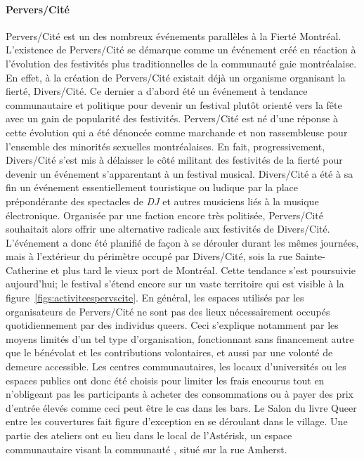 \paragraph{Pervers/Cité}
\label{subsec:perverscite}
Pervers/Cité est un des nombreux événements parallèles à la Fierté Montréal.
L'existence de Pervers/Cité se démarque comme un événement créé en réaction à l'évolution des festivités plus traditionnelles de la communauté gaie montréalaise.
En effet, à la création de Pervers/Cité existait déjà un organisme organisant la fierté, Divers/Cité.
Ce dernier a d'abord été un événement à tendance communautaire et politique pour devenir un festival plutôt orienté vers la fête avec un gain de popularité des festivités.
Pervers/Cité est né d'une réponse à cette évolution qui a été dénoncée comme marchande et non rassembleuse pour l'ensemble des minorités sexuelles montréalaises.
En fait, progressivement, Divers/Cité s'est mis à délaisser le côté militant des festivités de la fierté pour  devenir un événement s'apparentant à un festival musical.
Divers/Cité a été à sa fin un événement essentiellement touristique ou ludique par la place prépondérante des spectacles de \emph{DJ} et autres musiciens liés à la musique électronique.
Organisée par une faction encore très politisée, Pervers/Cité souhaitait alors offrir une alternative radicale aux festivités de Divers/Cité.
L'événement a donc été planifié de façon à se dérouler durant les mêmes journées, mais à l'extérieur du périmètre occupé par Divers/Cité, sois la rue Sainte-Catherine et plus tard le vieux port de Montréal.
Cette tendance s'est poursuivie aujourd'hui; le festival s'étend encore sur un vaste territoire qui est visible à la figure~\ref{figs:activiteespervscite}.
En général, les espaces utilisés par les organisateurs de Pervers/Cité ne sont pas des lieux nécessairement occupés quotidiennement par des individus queers.
Ceci s'explique notamment par les moyens limités d'un tel type d'organisation, fonctionnant sans financement autre que le bénévolat et les contributions volontaires, et aussi par une volonté de demeure accessible.
Les centres communautaires, les locaux d'universités ou les espaces publics ont donc été choisis pour limiter les frais encourus tout en n’obligeant pas les participants à acheter des consommations ou à payer des prix d'entrée élevés comme ceci peut être le cas dans les bars.
Le Salon du livre Queer entre les couvertures fait figure d'exception en se déroulant dans le village.
Une partie des ateliers ont eu lieu dans le local de l'Astérisk, un espace communautaire visant la communauté \lgbt{}, situé sur la rue Amherst.

